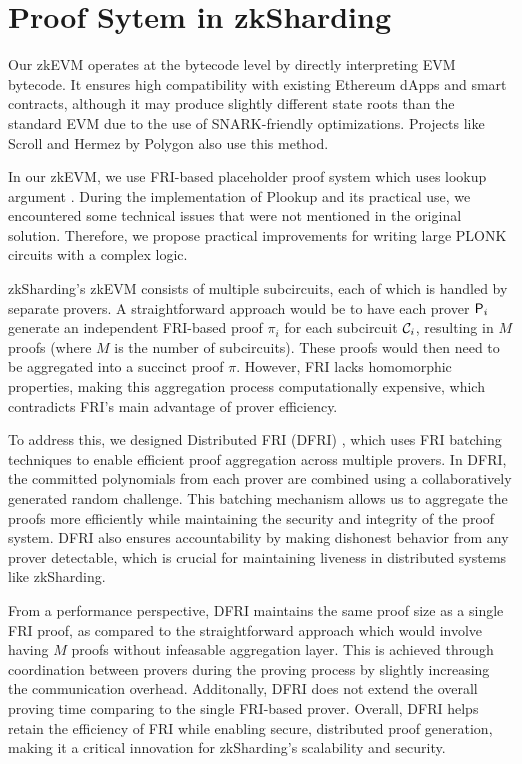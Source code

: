 \section{Proof Sytem in zkSharding}
\label{sec:zkp}
Our zkEVM \cite{zkevm} operates at the bytecode level by directly
interpreting EVM bytecode. It  ensures high compatibility with existing
Ethereum dApps and smart contracts, although it may produce slightly
different state roots than the standard EVM due to the use of
SNARK-friendly optimizations. Projects like Scroll \cite{scroll} and
Hermez \cite{hermez} by Polygon also use this method.

In our zkEVM, we use FRI-based placeholder proof system \cite{placeholder}
which uses  lookup argument \cite{plookup}.  During the implementation of
Plookup and its practical use, we encountered some technical issues that
were not mentioned in the original solution. Therefore, we propose
practical improvements \cite{plookuptweaks} for writing large PLONK
circuits with a complex logic.

zkSharding’s zkEVM consists of multiple subcircuits, each of which is handled by separate provers. A
straightforward
approach would be to have each prover $\mathsf{P}_i$ generate an independent
FRI-based proof $\pi_i$ for each subcircuit $\mathcal{C}_i$, resulting in $M$
proofs (where $M$ is the number of subcircuits). These proofs would then
need to be aggregated into a succinct proof $\pi$. However, FRI lacks
homomorphic properties, making this aggregation process computationally
expensive, which contradicts FRI's main advantage of prover efficiency.

To address this, we designed Distributed FRI (DFRI) \cite{dfri}, which
uses FRI batching techniques to enable efficient proof aggregation across
multiple provers. In DFRI, the committed polynomials from each prover are
combined using a collaboratively generated random challenge. This batching
mechanism allows us to aggregate the proofs more efficiently while
maintaining the security and integrity of the proof system. DFRI also
ensures accountability by making dishonest behavior from any prover
detectable, which is crucial for maintaining liveness in distributed
systems like zkSharding.

From a performance perspective, DFRI maintains the same proof size as a
single FRI proof, as compared to the straightforward approach which would
involve having $M$ proofs without infeasable aggregation layer. This is
achieved through coordination between provers during the proving process
by slightly increasing the communication overhead. Additonally, DFRI does
not extend the overall proving time comparing to the single FRI-based
prover.
Overall, DFRI helps retain the efficiency of FRI while enabling secure,
distributed proof generation, making it a critical innovation for
zkSharding's scalability and security.